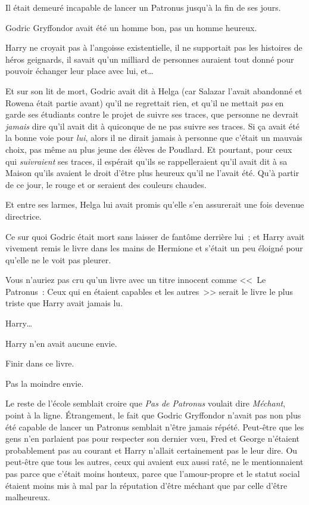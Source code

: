 Il était demeuré incapable de lancer un Patronus jusqu'à la fin de ses jours.

Godric Gryffondor avait été un homme bon, pas un homme heureux.

Harry ne croyait pas à l'angoisse existentielle, il ne supportait pas les histoires de héros geignards, il savait qu'un milliard de personnes auraient tout donné pour pouvoir échanger leur place avec lui, et…

Et sur son lit de mort, Godric avait dit à Helga (car Salazar l'avait abandonné et Rowena était partie avant) qu'il ne regrettait rien, et qu'il ne mettait \emph{pas} en garde ses étudiants contre le projet de suivre ses traces, que personne ne devrait \emph{jamais} dire qu'il avait dit à quiconque de ne pas suivre ses traces. Si ça avait été la bonne voie pour \emph{lui}, alors il ne dirait jamais à personne que c'était un mauvais choix, pas même au plus jeune des élèves de Poudlard. Et pourtant, pour ceux qui \emph{suivraient} ses traces, il espérait qu'ils se rappelleraient qu'il avait dit à sa Maison qu'ils avaient le droit d'être plus heureux qu'il ne l'avait été. Qu'à partir de ce jour, le rouge et or seraient des couleurs chaudes.

Et entre ses larmes, Helga lui avait promis qu'elle s'en assurerait une fois devenue directrice.

Ce sur quoi Godric était mort sans laisser de fantôme derrière lui~; et Harry avait vivement remis le livre dans les mains de Hermione et s'était un peu éloigné pour qu'elle ne le voit pas pleurer.

Vous n'auriez pas cru qu'un livre avec un titre innocent comme <<~Le Patronus~: Ceux qui en étaient capables et les autres~>> serait le livre le plus triste que Harry avait jamais lu.

Harry…

Harry n'en avait aucune envie.

Finir dans ce livre.

Pas la moindre envie.

Le reste de l'école semblait croire que \emph{Pas de Patronus} voulait dire \emph{Méchant}, point à la ligne. Étrangement, le fait que Godric Gryffondor n'avait pas non plus été capable de lancer un Patronus semblait n'être jamais répété. Peut-être que les gens n'en parlaient pas pour respecter son dernier vœu, Fred et George n'étaient probablement pas au courant et Harry n'allait certainement pas le leur dire. Ou peut-être que tous les autres, ceux qui avaient eux aussi raté, ne le mentionnaient pas parce que c'était moins honteux, parce que l'amour-propre et le statut social étaient moins mis à mal par la réputation d'être méchant que par celle d'être malheureux.

